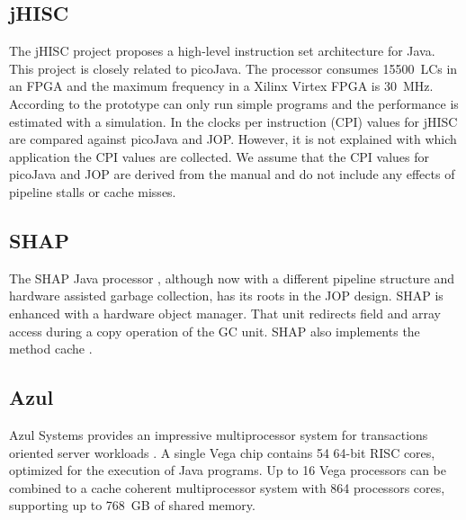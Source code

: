 \subsection{jHISC} 

The jHISC project \cite{jHISC:jnl2006} proposes a high-level
instruction set architecture for Java. This project is closely
related to picoJava. The processor consumes 15500~LCs in an FPGA and
the maximum frequency in a Xilinx Virtex FPGA is 30~MHz.
%
%
According to \cite{jHISC:jnl2006} the prototype can only run simple
programs and the performance is estimated with a simulation. In
\cite{jHISC2006} the clocks per instruction (CPI) values for jHISC
are compared against picoJava and JOP. However, it is not explained
with which application the CPI values are collected. We assume that
the CPI values for picoJava and JOP are derived from the manual and
do not include any effects of pipeline stalls or cache misses.

\subsection{SHAP} 

The SHAP Java processor \cite{shap}, although now with a different
pipeline structure and hardware assisted garbage collection, has its
roots in the JOP design. SHAP is enhanced with a hardware object
manager. That unit redirects field and array access during a copy
operation of the GC unit. SHAP also implements the method cache
\cite{shap:mcache}.


\subsection{Azul} 

Azul Systems provides an impressive multiprocessor system for
transactions oriented server workloads \cite{azul}. A single Vega
chip contains 54 64-bit RISC cores, optimized for the execution of
Java programs. Up to 16 Vega processors can be combined to a cache
coherent multiprocessor system with 864 processors cores, supporting
up to 768~GB of shared memory.


